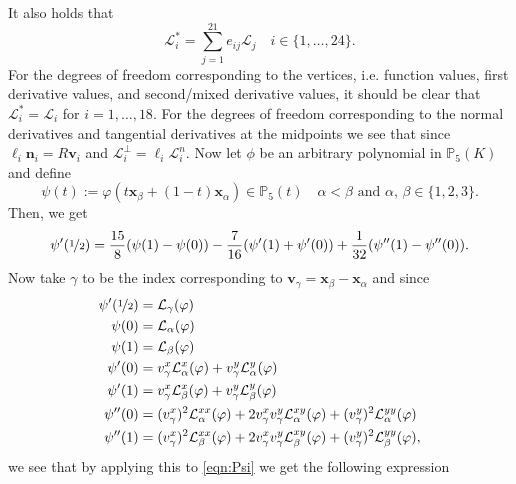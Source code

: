 It also holds that
\begin{equation}
  \mathcal{L}^*_i = \sum_{j=1}^{21} e_{ij} \mathcal{L}_j \quad i\in
  \{1,\dots,24\}.
  \label{eqn:FunctionalsE}
\end{equation}
For the degrees of freedom corresponding to the vertices, i.e. function values,
first derivative values, and second/mixed derivative values, it should be clear
that $\mathcal{L}^*_i = \mathcal{L}_i$ for $i=1,\dots,18$. For the degrees of
freedom corresponding to the normal derivatives and tangential derivatives at
the midpoints we see that since $\ell_i \mathbf{n}_i = R \mathbf{v}_i$ and
$\mathcal{L}^{\perp}_i = \ell_i \mathcal{L}^n_i$. Now let $\phi$ be an arbitrary
polynomial in $\mathbb{P}_5(K)$ and define
\begin{equation*}
  \psi(t) := \varphi(t\mathbf{x}_{\beta} + (1-t)\mathbf{x}_{\alpha}) \in
  \mathbb{P}_5(t) \quad \alpha<\beta \text{ and } \alpha,\,\beta \in \{1,2,3\}.
\end{equation*}
Then, we get
\begin{equation}
  \psi'(\nicefrac{1}{2}) = \frac{15}{8} (\psi(1)-\psi(0)) -
  \frac{7}{16} (\psi'(1)+\psi'(0)) + \frac{1}{32} (\psi''(1)-\psi''(0)).
  \label{eqn:Psi}
\end{equation}
Now take $\gamma$ to be the index corresponding to $\mathbf{v}_{\gamma} =
\mathbf{x}_{\beta} - \mathbf{x}_{\alpha}$ and since
\begin{align*}
  \psi'(\nicefrac{1}{2}) &= \mathcal{L}_{\gamma}(\varphi) \\
  \psi(0) &= \mathcal{L}_{\alpha}(\varphi) \\
  \psi(1) &= \mathcal{L}_{\beta}(\varphi) \\
  \psi'(0) &= v^x_{\gamma}\mathcal{L}^x_{\alpha}(\varphi) +
    v^y_{\gamma}\mathcal{L}^y_{\alpha}(\varphi) \\
  \psi'(1) &= v^x_{\gamma}\mathcal{L}^x_{\beta}(\varphi) +
    v^y_{\gamma}\mathcal{L}^y_{\beta}(\varphi) \\
  \psi''(0) &= (v^x_{\gamma})^2\mathcal{L}^{xx}_{\alpha}(\varphi) +
    2 v^x_{\gamma}v^y_{\gamma}\mathcal{L}^{xy}_{\alpha}(\varphi) +
    (v^y_{\gamma})^2\mathcal{L}^{yy}_{\alpha}(\varphi) \\
  \psi''(1) &= (v^x_{\gamma})^2\mathcal{L}^{xx}_{\beta}(\varphi) +
    2 v^x_{\gamma}v^y_{\gamma}\mathcal{L}^{xy}_{\beta}(\varphi) +
    (v^y_{\gamma})^2\mathcal{L}^{yy}_{\beta}(\varphi),
\end{align*}
we see that by applying this to \eqref{eqn:Psi} we get the following expression
